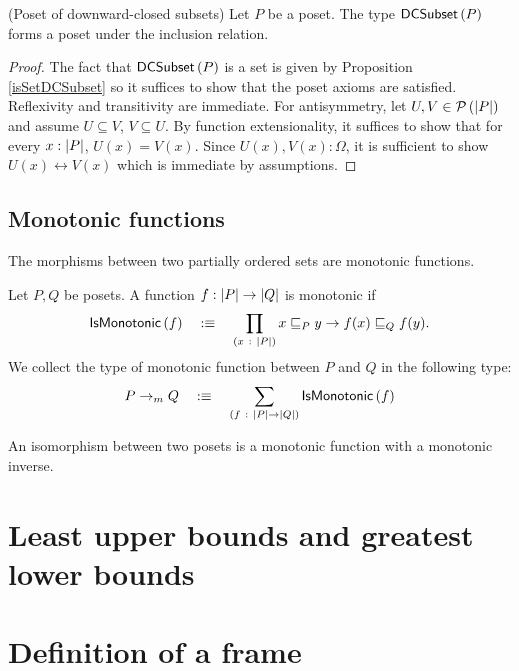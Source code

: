 \begin{thm}(Poset of downward-closed subsets)
  Let $P$ be a poset. The type $\mathsf{DCSubset}{}\left(P\right)$ forms a poset under the
  inclusion relation.
\end{thm}
\begin{proof}
  The fact that $\mathsf{DCSubset}{}\left(P\right)$ is a set is given by
  Proposition \ref{isSetDCSubset} so it suffices to show that the poset axioms are
  satisfied. Reflexivity and transitivity are immediate. For antisymmetry, let $U,
  V \in \mathcal{P}\left(\left| P \right|\right)$ and assume $U \subseteq V$, $V \subseteq U$. By function extensionality, it suffices
  to show that for every $x : \left| P \right|$, $U(x) = V(x)$. Since $U(x), V(x) : \Omega$, it is
  sufficient to show $U(x) \leftrightarrow V(x)$ which is immediate by assumptions.
\end{proof}

\subsection{Monotonic functions}

The morphisms between two partially ordered sets are monotonic functions.

\begin{defn}
  Let $P, Q$ be posets. A function $f : \left| P \right| \rightarrow \left| Q \right|$ is monotonic if
  \begin{equation*}
    \mathsf{IsMonotonic}{}\left(f\right) \quad:\equiv\quad \prod_{(x~:~\left| P \right|)} x \sqsubseteq_P y \rightarrow f(x) \sqsubseteq_Q f(y).
  \end{equation*}
  We collect the type of monotonic function between $P$ and $Q$ in the following type:
  \begin{equation*}
    P \rightarrow_m Q \quad:\equiv\quad \sum_{(f~:~\left| P \right| \rightarrow \left| Q \right|)} \mathsf{IsMonotonic}{}\left(f\right)
  \end{equation*}
\end{defn}

\begin{defn}
  An isomorphism between two posets is a monotonic function with a monotonic inverse.
\end{defn}

\section{Least upper bounds and greatest lower bounds}

\section{Definition of a frame}\label{sec:frame}

